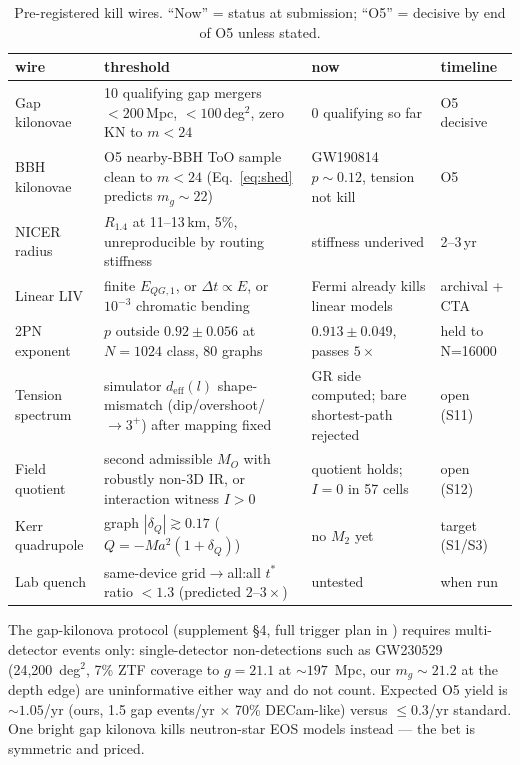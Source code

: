 \documentclass[11pt]{article}
\begin{document}
\begin{table}[ht]\centering\footnotesize
\caption{Pre-registered kill wires. ``Now'' = status at submission; ``O5'' = decisive by end of O5 unless stated.}
\label{tab:kill}
\begin{tabular}{@{}l p{6.0cm} p{4.2cm} l@{}}\toprule
wire & threshold & now & timeline \\\midrule
Gap kilonovae & 10 qualifying gap mergers $< 200$\,Mpc, $< 100$\,deg$^2$, zero KN to $m < 24$ & 0 qualifying so far & O5 decisive \\
BBH kilonovae & O5 nearby-BBH ToO sample clean to $m < 24$ (Eq.~\ref{eq:shed} predicts $m_g \sim 22$) & GW190814 $p \sim 0.12$, tension not kill & O5 \\
NICER radius & $R_{1.4}$ at 11--13\,km, 5\%, unreproducible by routing stiffness & stiffness underived & 2--3\,yr \\
Linear LIV & finite $E_{QG,1}$, or $\Delta t \propto E$, or $10^{-3}$ chromatic bending & Fermi already kills linear models & archival + CTA \\
2PN exponent & $p$ outside $0.92 \pm 0.056$ at $N = 1024$ class, 80 graphs & $0.913 \pm 0.049$, passes $5\times$ & held to N=16000 \\
Tension spectrum & simulator $d_{\mathrm{eff}}(l)$ shape-mismatch (dip/overshoot/$\to3^+$) after mapping fixed & GR side computed; bare shortest-path rejected & open (S11) \\
Field quotient & second admissible $M_O$ with robustly non-3D IR, or interaction witness $I > 0$ & quotient holds; $I = 0$ in 57 cells & open (S12) \\
Kerr quadrupole & graph $|\delta_Q|\gtrsim0.17$ ($Q=-Ma^2(1+\delta_Q)$) & no $M_2$ yet & target (S1/S3) \\
Lab quench & same-device grid$\to$all:all $t^*$ ratio $< 1.3$ (predicted $2$--$3\times$) & untested & when run \\\bottomrule
\end{tabular}
\end{table}

The gap-kilonova protocol (supplement \S4, full trigger plan in
) requires multi-detector events only:
single-detector non-detections such as GW230529 (24,200~deg$^2$, 7\% ZTF
coverage to $g = 21.1$ at $\sim 197$~Mpc, our $m_g \sim 21.2$ at the depth
edge) are uninformative either way and do not count. Expected O5 yield is
$\sim 1.05$/yr (ours, 1.5 gap events/yr $\times$ 70\% DECam-like) versus
$\le 0.3$/yr standard. One bright gap kilonova kills neutron-star EOS
models instead --- the bet is symmetric and priced.
\end{document}
